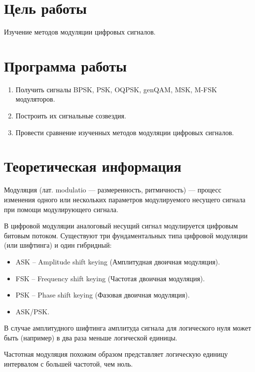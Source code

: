 
\usepackage{minted}




\setcounter{page}{2}



\section{Цель работы}
Изучение методов модуляции цифровых сигналов.

\section{Программа работы}
\begin{enumerate}
	\item Получить сигналы BPSK, PSK, OQPSK, genQAM, MSK, M-FSK модуляторов.
	\item Построить их сигнальные созвездия.
	\item Провести сравнение изученных методов модуляции цифровых сигналов.
	
\end{enumerate}

\section{Теоретическая информация}
Модуляция (лат. modulatio — размеренность, ритмичность) — процесс изменения одного или нескольких параметров модулируемого несущего сигнала при помощи модулирующего сигнала.

В цифровой модуляции аналоговый несущий сигнал модулируется цифровым битовым потоком.
Существуют три фундаментальных типа цифровой модуляции (или шифтинга) и один гибридный:
\begin{itemize}
	\item ASK – Amplitude shift keying (Амплитудная двоичная модуляция).
	\item FSK – Frequency shift keying (Частотая двоичная модуляция).
	\item PSK – Phase shift keying (Фазовая двоичная модуляция).
	\item ASK/PSK.
\end{itemize}

В случае амплитудного шифтинга амплитуда сигнала для логического нуля может быть (например) в два раза меньше логической единицы.

Частотная модуляция похожим образом представляет логическую единицу интервалом с большей частотой, чем ноль.

